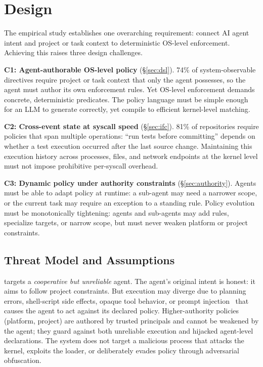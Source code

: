 \section{Design}
\label{sec:design}

The empirical study establishes one overarching requirement: connect
AI agent intent and project or task context to deterministic OS-level
enforcement.
Achieving this raises three design challenges.

\textbf{C1: Agent-authorable OS-level policy} (\S\ref{sec:dsl}).
74\% of system-observable directives require project or task context that
only the agent possesses, so the agent must author its own enforcement
rules. Yet OS-level enforcement demands concrete, deterministic
predicates. The policy language must be simple enough for an LLM to
generate correctly, yet compile to efficient kernel-level matching.

\textbf{C2: Cross-event state at syscall speed} (\S\ref{sec:ifc}).
81\% of repositories require policies that span multiple
operations: ``run tests before committing'' depends on whether a test
execution occurred after the last source change. Maintaining this
execution history across processes, files, and network endpoints at the
kernel level must not impose prohibitive per-syscall overhead.

\textbf{C3: Dynamic policy under authority constraints}
(\S\ref{sec:authority}).
Agents must be able to adapt policy at runtime: a sub-agent may need a
narrower scope, or the current task may require an exception to a
standing rule. Policy evolution must be monotonically tightening: agents
and sub-agents may add rules, specialize targets, or narrow scope, but
must never weaken platform or project constraints.

\subsection{Threat Model and Assumptions}

\sys{} targets a \emph{cooperative but unreliable} agent. The agent's
original intent is honest: it aims to follow project constraints. But
execution may diverge due to planning errors, shell-script side effects,
opaque tool behavior, or prompt injection~\cite{perez2022prompt} that
causes the agent to act against its declared policy. Higher-authority policies (platform, project)
are authored by trusted principals and cannot be weakened by the agent;
they guard against both unreliable execution and hijacked agent-level
declarations. The system does not target a malicious process that attacks
the kernel, exploits the loader, or deliberately evades policy through
adversarial obfuscation.

